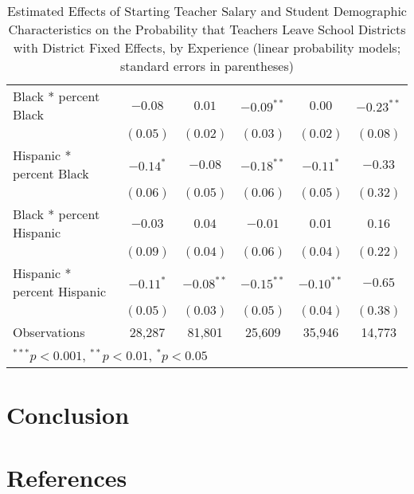 \documentclass[]{article}
\begin{document}
\begin{table}
\begin{center}
\begin{tabular}{l c c c c c }
\quad Black * percent Black                 & $-0.08$       & $0.01$       & $-0.09^{**}$ & $0.00$        & $-0.23^{**}$  \\
                                            & $(0.05)$      & $(0.02)$     & $(0.03)$     & $(0.02)$      & $(0.08)$      \\
\quad Hispanic * percent Black              & $-0.14^{*}$   & $-0.08$      & $-0.18^{**}$ & $-0.11^{*}$   & $-0.33$       \\
                                            & $(0.06)$      & $(0.05)$     & $(0.06)$     & $(0.05)$      & $(0.32)$      \\
\quad Black * percent Hispanic              & $-0.03$       & $0.04$       & $-0.01$      & $0.01$        & $0.16$        \\
                                            & $(0.09)$      & $(0.04)$     & $(0.06)$     & $(0.04)$      & $(0.22)$      \\
\quad Hispanic * percent Hispanic           & $-0.11^{*}$   & $-0.08^{**}$ & $-0.15^{**}$ & $-0.10^{**}$  & $-0.65$       \\
                                            & $(0.05)$      & $(0.03)$     & $(0.05)$     & $(0.04)$      & $(0.38)$      \\
\hline
Observations                                & 28,287         & 81,801        & 25,609        & 35,946         & 14,773         \\
\hline
\multicolumn{6}{l}{\scriptsize{$^{***}p<0.001$, $^{**}p<0.01$, $^*p<0.05$}}
\end{tabular}
\caption{Estimated Effects of Starting Teacher Salary and Student Demographic Characteristics on the Probability that Teachers Leave School Districts with District Fixed Effects, by Experience (linear probability models; standard errors in parentheses)}
\label{tbl:reg_lpm_fe}
\end{center}
\end{table}

\section{Conclusion}\label{conclusion}

\section{References}\label{references}
\end{document}
